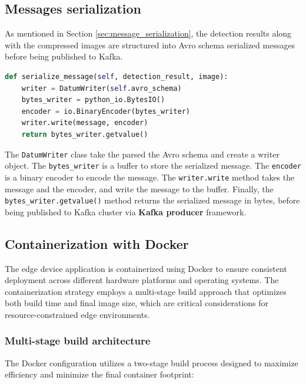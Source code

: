 \subsection{Messages serialization}
\label{sec:edge_message_serialization}

As mentioned in Section \ref{sec:message_serialization}, the detection results along with the compressed images are structured into Avro schema serialized messages before being published to Kafka.\\

\newpage

\begin{lstlisting}[language=python, caption={Message serialization with Avro schema, using \texttt{DatumWriter} and \texttt{BinaryEncoder}}]
def serialize_message(self, detection_result, image):
    writer = DatumWriter(self.avro_schema)
    bytes_writer = python_io.BytesIO()
    encoder = io.BinaryEncoder(bytes_writer)
    writer.write(message, encoder)
    return bytes_writer.getvalue()
\end{lstlisting}

The \texttt{DatumWriter} class take the parsed the Avro schema and create a writer object. The \texttt{bytes\_writer} is a buffer to store the serialized message. The \texttt{encoder} is a binary encoder to encode the message. The \texttt{writer.write} method takes the message and the encoder, and write the message to the buffer. Finally, the \texttt{bytes\_writer.getvalue()} method returns the serialized message in bytes, before being published to Kafka cluster via \textbf{Kafka producer} framework.

\subsection{Containerization with Docker}
\label{sec:edge_containerization}

The edge device application is containerized using Docker to ensure consistent deployment across different hardware platforms and operating systems. The containerization strategy employs a multi-stage build approach that optimizes both build time and final image size, which are critical considerations for resource-constrained edge environments.

\subsubsection{Multi-stage build architecture}

The Docker configuration utilizes a two-stage build process designed to maximize efficiency and minimize the final container footprint:

